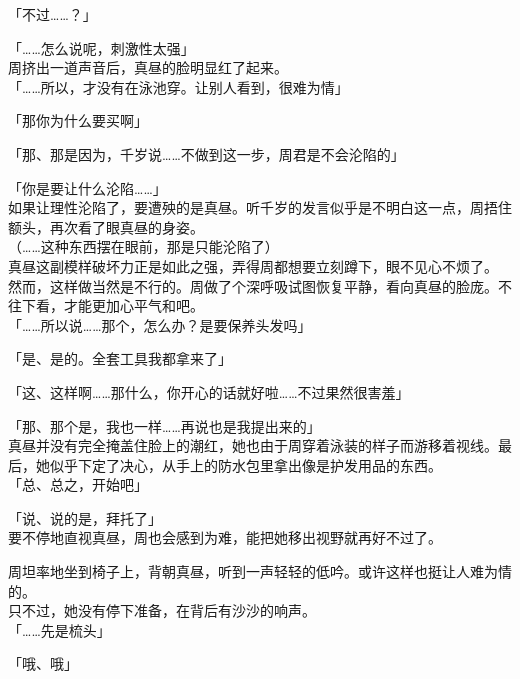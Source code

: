 「不过……？」

「……怎么说呢，刺激性太强」\\

周挤出一道声音后，真昼的脸明显红了起来。\\

「……所以，才没有在泳池穿。让别人看到，很难为情」

「那你为什么要买啊」

「那、那是因为，千岁说……不做到这一步，周君是不会沦陷的」

「你是要让什么沦陷……」\\

如果让理性沦陷了，要遭殃的是真昼。听千岁的发言似乎是不明白这一点，周捂住额头，再次看了眼真昼的身姿。\\

（……这种东西摆在眼前，那是只能沦陷了）\\

真昼这副模样破坏力正是如此之强，弄得周都想要立刻蹲下，眼不见心不烦了。\\

然而，这样做当然是不行的。周做了个深呼吸试图恢复平静，看向真昼的脸庞。不往下看，才能更加心平气和吧。\\

「……所以说……那个，怎么办？是要保养头发吗」

「是、是的。全套工具我都拿来了」

「这、这样啊……那什么，你开心的话就好啦……不过果然很害羞」

「那、那个是，我也一样……再说也是我提出来的」\\

真昼并没有完全掩盖住脸上的潮红，她也由于周穿着泳装的样子而游移着视线。最后，她似乎下定了决心，从手上的防水包里拿出像是护发用品的东西。\\

「总、总之，开始吧」

「说、说的是，拜托了」\\

要不停地直视真昼，周也会感到为难，能把她移出视野就再好不过了。

周坦率地坐到椅子上，背朝真昼，听到一声轻轻的低吟。或许这样也挺让人难为情的。\\

只不过，她没有停下准备，在背后有沙沙的响声。\\

「……先是梳头」

「哦、哦」\\

